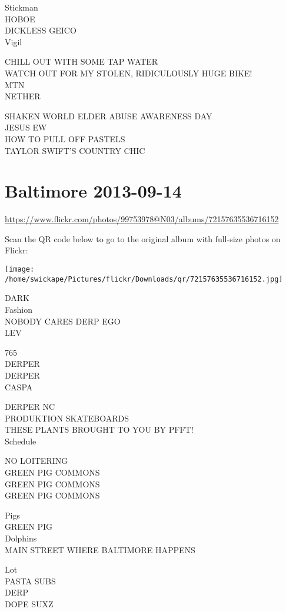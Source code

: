 \documentclass[10pt,letterpaper]{article}
\begin{document}
Stickman\\
HOBOE\\
DICKLESS GEICO\\
Vigil

CHILL OUT WITH SOME TAP WATER\\
WATCH OUT FOR MY STOLEN, RIDICULOUSLY HUGE BIKE!\\
MTN\\
NETHER

SHAKEN WORLD ELDER ABUSE AWARENESS DAY\\
JESUS EW\\
HOW TO PULL OFF PASTELS\\
TAYLOR SWIFT'S COUNTRY CHIC


\section*{Baltimore 2013-09-14}

\url{https://www.flickr.com/photos/99753978@N03/albums/72157635536716152}

Scan the QR code below to go to the original album with full-size photos on Flickr:

\texttt{[image: /home/swickape/Pictures/flickr/Downloads/qr/72157635536716152.jpg]}


DARK\\
Fashion\\
NOBODY CARES DERP EGO\\
LEV

765\\
DERPER\\
DERPER\\
CASPA

DERPER NC\\
PRODUKTION SKATEBOARDS\\
THESE PLANTS BROUGHT TO YOU BY PFFT!\\
Schedule

NO LOITERING\\
GREEN PIG COMMONS\\
GREEN PIG COMMONS\\
GREEN PIG COMMONS

Pigs\\
GREEN PIG\\
Dolphins\\
MAIN STREET WHERE BALTIMORE HAPPENS

Lot\\
PASTA SUBS\\
DERP\\
DOPE SUXZ
\end{document}
